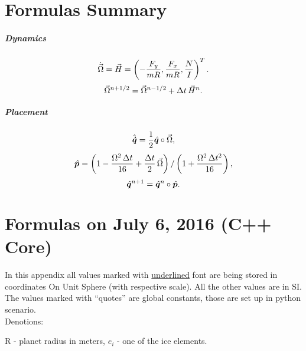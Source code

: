 
\chapter{Formulas Summary}

\paragraph{Dynamics}

\begin{equation}\label{eq:dynamicsH-x}
  \dot{{\vec{\Omega}}} = {\vec{H}} = \left( -\frac{F_y}{mR}, \frac{F_x}{mR},
  \frac{N}{I} \right)^T.
\end{equation}
\begin{equation}
  {\vec{\Omega}}^{n+1/2} = {\vec{\Omega}}^{n-1/2} + \Delta t\,{\vec{H}}^n.
\end{equation}

\paragraph{Placement}

\begin{equation}\label{eq:positionomega-x}
  {\hat{\bm{\dot q}}} = \frac{1}{2}{\hat{\bm{q}}}\circ{\vec{\Omega}},
\end{equation}
\begin{equation}
  {\hat{\bm{p}}} = \left(1 - \frac{\Omega^2\,\Delta t}{16} + \frac{\Delta
    t}{2}\,{\vec{\Omega}} \right) / \left( 1 +\frac{ \Omega^2\,\Delta
    t^2}{16}\right),
\end{equation}
\begin{equation}
  {\hat{\bm{q}}}^{n+1} = {\hat{\bm{q}}}^{n} \circ {\hat{\bm{p}}}.
\end{equation}


\chapter{Formulas on July 6, 2016 (C++ Core)}

In this appendix all values marked with \underline{underlined} font 
are being stored in coordinates On Unit Sphere (with respective scale).
All the other values are in SI.
\\
The values marked with ``quotes'' are global constants, those are set
up in python scenario.
\\
Denotions:

R - planet radius in meters, $e_i$ - one of the ice elements.

